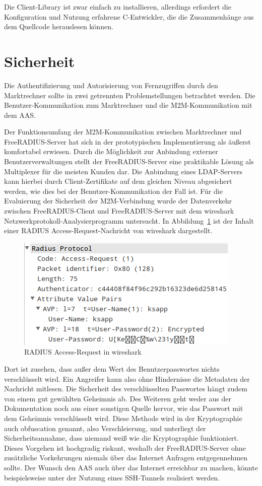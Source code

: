 \documentclass[11pt,a4paper]{report}
\begin{document}
Die Client-Library ist zwar einfach zu installieren, allerdings erfordert die Konfiguration und Nutzung erfahrene C-Entwickler, die die Zusammenhänge aus dem Quellcode herauslesen können. 

\section{Sicherheit}

Die Authentifizierung und Autorisierung von Fernzugriffen durch den Marktrechner sollte in zwei getrennten Problemstellungen betrachtet werden. Die Benutzer-Kommunikation zum Marktrechner und die M2M-Kommunikation mit dem AAS. 

Der Funktionsumfang der M2M-Kommunikation zwischen Marktrechner und FreeRADIUS-Server hat sich in der prototypischen Implementierung als äußerst komfortabel erwiesen. Durch die Möglichkeit zur Anbindung externer Benutzerverwaltungen stellt der FreeRADIUS-Server eine praktikable Lösung als Multiplexer für die meisten Kunden dar. Die Anbindung eines LDAP-Servers kann hierbei durch Client-Zertifikate auf dem gleichen Niveau abgesichert werden, wie dies bei der Benutzer-Kommunikation der Fall ist. Für die Evaluierung der Sicherheit der M2M-Verbindung wurde der Datenverkehr zwischen FreeRADIUS-Client und FreeRADIUS-Server mit dem wireshark Netzwerkprotokoll-Analysierprogramm untersucht. In Abbildung~\ref{fig:radius_wire} ist der Inhalt einer RADIUS Access-Request-Nachricht von wireshark dargestellt.

\begin{figure}[htbp]
\centering
\includegraphics[scale=1]{images/radius_request_wireshark.png}
\caption{RADIUS Access-Request in wireshark}
\label{fig:radius_wire}
\end{figure}

Dort ist zusehen, dass außer dem Wert des Benutzerpasswortes nichts verschlüsselt wird. Ein Angreifer kann also ohne Hindernisse die Metadaten der Nachricht mitlesen. Die Sicherheit des verschlüsselten Passwortes hängt zudem von einem gut gewählten Geheimnis ab. Des Weiteren geht weder aus der Dokumentation noch aus einer sonstigen Quelle hervor, wie das Passwort mit dem Geheimnis verschlüsselt wird. Diese Methode wird in der Kryptographie auch obfuscation genannt, also Verschleierung, und unterliegt der Sicherheitsannahme, dass niemand weiß wie die Kryptographie funktioniert. Dieses Vorgehen ist hochgradig riskant, weshalb der FreeRADIUS-Server ohne zusätzliche Vorkehrungen niemals über das Internet Anfragen entgegennehmen sollte. Der Wunsch den AAS auch über das Internet erreichbar zu machen, könnte beispielsweise unter der Nutzung eines SSH-Tunnels realisiert werden.
\end{document}
